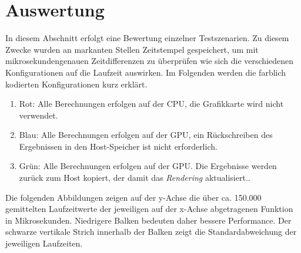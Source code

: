 \documentclass[conference]{IEEEtran}
\begin{document}
\section{Auswertung}
In diesem Abschnitt erfolgt eine Bewertung einzelner Testszenarien. Zu diesem Zwecke wurden an markanten Stellen Zeitstempel gespeichert, um mit mikrosekundengenauen Zeitdifferenzen zu \"uberpr\"ufen wie sich die verschiedenen Konfigurationen auf die Laufzeit auswirken. Im Folgenden werden die farblich kodierten Konfigurationen kurz erkl\"art.


\begin{enumerate}
\item Rot: Alle Berechnungen erfolgen auf der CPU, die Grafikkarte wird nicht verwendet.
\item Blau: Alle Berechnungen erfolgen auf der GPU, ein R\"uckschreiben des Ergebnissen in den Host-Speicher ist nicht erforderlich.
\item Gr\"un: Alle Berechnungen erfolgen auf der GPU. Die Ergebnisse werden zur\"uck zum Host kopiert, der damit das \textit{Rendering} aktualisiert..
\end{enumerate}

Die folgenden Abbildungen zeigen auf der y-Achse die \"uber ca. 150.000 gemittelten Laufzeitwerte der jeweiligen auf der x-Achse abgetragenen Funktion in Mikrosekunden. Niedrigere Balken bedeuten daher bessere Performance. Der schwarze vertikale Strich innerhalb der Balken zeigt die Standardabweichung der jeweiligen Laufzeiten.
\end{document}
